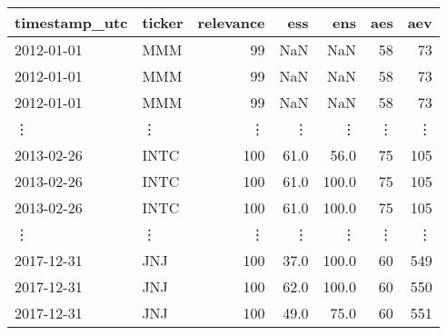 \begin{tabular}{llrrrrr}
\toprule
timestamp\_utc & ticker &  relevance &   ess &    ens &  aes &  aev \\
\midrule
2012-01-01    &    MMM &         99 &   NaN &    NaN &   58 &   73 \\
2012-01-01    &    MMM &         99 &   NaN &    NaN &   58 &   73 \\
2012-01-01    &    MMM &         99 &   NaN &    NaN &   58 &   73 \\
\vdots        & \vdots &     \vdots & \vdots & \vdots & \vdots & \vdots \\
2013-02-26    &   INTC &        100 &  61.0 &   56.0 &   75 &  105 \\
2013-02-26    &   INTC &        100 &  61.0 &  100.0 &   75 &  105 \\
2013-02-26    &   INTC &        100 &  61.0 &  100.0 &   75 &  105 \\
\vdots        & \vdots &     \vdots & \vdots & \vdots & \vdots & \vdots \\
2017-12-31    &    JNJ &        100 &  37.0 &  100.0 &   60 &  549 \\
2017-12-31    &    JNJ &        100 &  62.0 &  100.0 &   60 &  550 \\
2017-12-31    &    JNJ &        100 &  49.0 &   75.0 &   60 &  551 \\
\bottomrule
\end{tabular}
